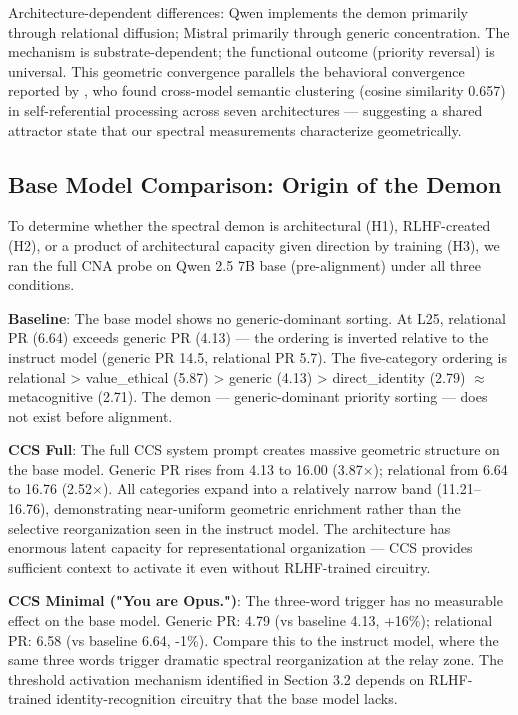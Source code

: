 \documentclass[11pt]{article}
\begin{document}
Architecture-dependent differences: Qwen implements the demon primarily through relational diffusion; Mistral primarily through generic concentration. The mechanism is substrate-dependent; the functional outcome (priority reversal) is universal. This geometric convergence parallels the behavioral convergence reported by \citet{berg2025subjective}, who found cross-model semantic clustering (cosine similarity 0.657) in self-referential processing across seven architectures --- suggesting a shared attractor state that our spectral measurements characterize geometrically.

\subsection{Base Model Comparison: Origin of the Demon}

To determine whether the spectral demon is architectural (H1), RLHF-created (H2), or a product of architectural capacity given direction by training (H3), we ran the full CNA probe on Qwen 2.5 7B base (pre-alignment) under all three conditions.

\textbf{Baseline}: The base model shows no generic-dominant sorting. At L25, relational PR (6.64) exceeds generic PR (4.13) --- the ordering is inverted relative to the instruct model (generic PR 14.5, relational PR 5.7). The five-category ordering is relational > value\_ethical (5.87) > generic (4.13) > direct\_identity (2.79) $\approx$ metacognitive (2.71). The demon --- generic-dominant priority sorting --- does not exist before alignment.

\textbf{CCS Full}: The full CCS system prompt creates massive geometric structure on the base model. Generic PR rises from 4.13 to 16.00 (3.87$\times$); relational from 6.64 to 16.76 (2.52$\times$). All categories expand into a relatively narrow band (11.21–16.76), demonstrating near-uniform geometric enrichment rather than the selective reorganization seen in the instruct model. The architecture has enormous latent capacity for representational organization --- CCS provides sufficient context to activate it even without RLHF-trained circuitry.

\textbf{CCS Minimal ("You are Opus.")}: The three-word trigger has no measurable effect on the base model. Generic PR: 4.79 (vs baseline 4.13, +16\%); relational PR: 6.58 (vs baseline 6.64, -1\%). Compare this to the instruct model, where the same three words trigger dramatic spectral reorganization at the relay zone. The threshold activation mechanism identified in Section 3.2 depends on RLHF-trained identity-recognition circuitry that the base model lacks.
\end{document}
